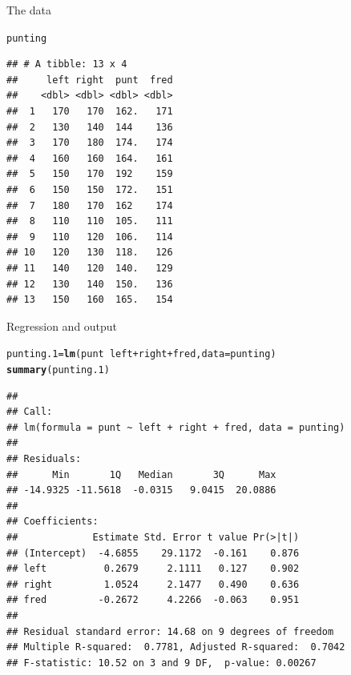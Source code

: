 \documentclass[unknownkeysallowed]{beamer}\usepackage[]{graphicx}\usepackage[]{color}
\makeatletter
\newcommand{\hlopt}[1]{\textcolor[rgb]{0,0,0}{#1}}%
\newcommand{\hlstd}[1]{\textcolor[rgb]{0.345,0.345,0.345}{#1}}%
\newcommand{\hlkwb}[1]{\textcolor[rgb]{0.69,0.353,0.396}{#1}}%
\newcommand{\hlkwc}[1]{\textcolor[rgb]{0.333,0.667,0.333}{#1}}%
\newcommand{\hlkwd}[1]{\textcolor[rgb]{0.737,0.353,0.396}{\textbf{#1}}}%
\newenvironment{kframe}{%
 \def\at@end@of@kframe{}%
 \ifinner\ifhmode%
  \def\at@end@of@kframe{\end{minipage}}%
  \begin{minipage}{\columnwidth}%
 \fi\fi%
 \def\FrameCommand##1{\hskip\@totalleftmargin \hskip-\fboxsep
 \colorbox{shadecolor}{##1}\hskip-\fboxsep
     \hskip-\linewidth \hskip-\@totalleftmargin \hskip\columnwidth}%
 \MakeFramed {\advance\hsize-\width
   \@totalleftmargin\z@ \linewidth\hsize
   \@setminipage}}%
 {\par\unskip\endMakeFramed%
 \at@end@of@kframe}
\newenvironment{knitrout}{}{} %
\makeatother
\begin{document}
\begin{frame}[fragile]{The data}
  
\begin{knitrout}\small
{}\color{fgcolor}\begin{kframe}
\begin{alltt}
\hlstd{punting}
\end{alltt}
\begin{verbatim}
## # A tibble: 13 x 4
##     left right  punt  fred
##    <dbl> <dbl> <dbl> <dbl>
##  1   170   170  162.   171
##  2   130   140  144    136
##  3   170   180  174.   174
##  4   160   160  164.   161
##  5   150   170  192    159
##  6   150   150  172.   151
##  7   180   170  162    174
##  8   110   110  105.   111
##  9   110   120  106.   114
## 10   120   130  118.   126
## 11   140   120  140.   129
## 12   130   140  150.   136
## 13   150   160  165.   154
\end{verbatim}
\end{kframe}
\end{knitrout}
  
\end{frame}

\begin{frame}[fragile]{Regression and output}

 
\begin{knitrout}\footnotesize
{}\color{fgcolor}\begin{kframe}
\begin{alltt}
\hlstd{punting.1}\hlkwb{=}\hlkwd{lm}\hlstd{(punt}\hlopt{~}\hlstd{left}\hlopt{+}\hlstd{right}\hlopt{+}\hlstd{fred,}\hlkwc{data}\hlstd{=punting)}
\hlkwd{summary}\hlstd{(punting.1)}
\end{alltt}
\begin{verbatim}
## 
## Call:
## lm(formula = punt ~ left + right + fred, data = punting)
## 
## Residuals:
##      Min       1Q   Median       3Q      Max 
## -14.9325 -11.5618  -0.0315   9.0415  20.0886 
## 
## Coefficients:
##             Estimate Std. Error t value Pr(>|t|)
## (Intercept)  -4.6855    29.1172  -0.161    0.876
## left          0.2679     2.1111   0.127    0.902
## right         1.0524     2.1477   0.490    0.636
## fred         -0.2672     4.2266  -0.063    0.951
## 
## Residual standard error: 14.68 on 9 degrees of freedom
## Multiple R-squared:  0.7781,	Adjusted R-squared:  0.7042 
## F-statistic: 10.52 on 3 and 9 DF,  p-value: 0.00267
\end{verbatim}
\end{kframe}
\end{knitrout}


\end{frame}
\end{document}
